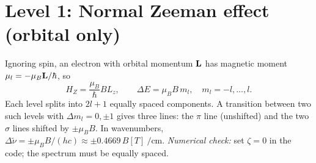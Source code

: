 \section{Level 1: Normal Zeeman effect (orbital only)}
Ignoring spin, an electron with orbital momentum $\vb{L}$ has magnetic moment
$\vb{\mu}_l = -\mu_B \vb{L}/\hbar$, so
\begin{equation}
  H_Z = \frac{\mu_B}{\hbar} B L_z, \qquad
  \Delta E = \mu_B B\, m_l, \quad m_l = -l,\dots,l .
\end{equation}
Each level splits into $2l+1$ equally spaced components. A transition between two such
levels with $\Delta m_l = 0,\pm1$ gives three lines: the $\pi$ line (unshifted) and the two
$\sigma$ lines shifted by $\pm \mu_B B$. In wavenumbers,
$\Delta\tilde\nu = \pm \mu_B B/(hc) \approx \pm 0.4669\,B[\si{T}]\ \si{\per\centi\metre}$.
\emph{Numerical check:} set $\zeta=0$ in the code; the spectrum must be equally spaced.
